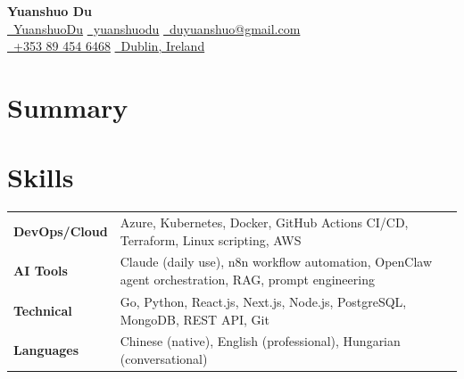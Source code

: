 \documentclass{simpleresume}
\begin{document}
\begin{center}
  {\Large\sffamily\bfseries\color{namecolor} Yuanshuo Du}\\[0.10cm]
  {\sffamily\small
    \href{https://github.com/YuanshuoDu}{\color{accent}\faGithub\color{muted}\ YuanshuoDu}
    \quad\textbullet\quad
    \href{https://linkedin.com/in/yuanshuodu}{\color{accent}\faLinkedin\color{muted}\ yuanshuodu}
    \quad\textbullet\quad
    \href{https://mail.google.com/mail/?view=cm&to=duyuanshuo@gmail.com}{\color{accent}\faEnvelope\color{muted}\ duyuanshuo@gmail.com}
  }\\[0.05cm]
  {\sffamily\small\color{muted}
    \href{tel:+353894546468}{\color{accent}\faPhone\color{muted}\ +353 89 454 6468}
    \quad\textemdash\quad
    \href{https://www.google.com/maps/place/Dublin,+Ireland}{\color{accent}\faMapMarker\ Dublin, Ireland}
  }
\end{center}
\headerrule

\section{Summary}
\vspace{-0.05cm}
\vspace{-0.08cm}

\section{Skills}
\noindent
\begin{tabular}{p{2.4cm}p{14.0cm}}
\textbf{DevOps/Cloud} & Azure, Kubernetes, Docker, GitHub Actions CI/CD, Terraform, Linux scripting, AWS \\[-3pt]
\textbf{AI Tools} & Claude (daily use), n8n workflow automation, OpenClaw agent orchestration, RAG, prompt engineering \\[-3pt]
\textbf{Technical} & Go, Python, React.js, Next.js, Node.js, PostgreSQL, MongoDB, REST API, Git \\[-3pt]
\textbf{Languages} & Chinese (native), English (professional), Hungarian (conversational) \\
\end{tabular}
\vspace{0.03cm}
\end{document}
